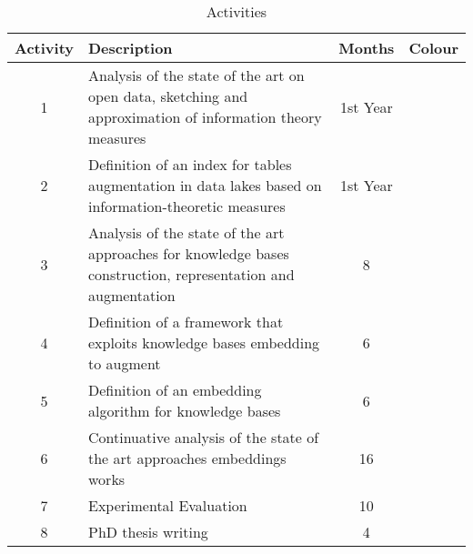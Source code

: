 \begin{table}[h!]\footnotesize
    \centering
    
    \caption{Activities\label{table1}}
    \begin{tabular}{|c|p{9cm}|c|c|}
        \hline
        \textbf{Activity} & \textbf{Description} & \textbf{Months} & \textbf{Colour}\\ \hline
        1 & Analysis of the state of the art on open data, sketching and approximation of information theory measures & 1st Year & \cellcolor{lightgreen} \\\hline
        2 & Definition of an index for tables augmentation in data lakes based on information-theoretic measures& 1st Year & \cellcolor{green} \\\hline
        3 & Analysis of the state of the art approaches for knowledge bases construction, representation and augmentation & 8 & \cellcolor{lightyellow} \\\hline
        4 & Definition of a framework that exploits knowledge bases embedding to augment & 6 & \cellcolor{orange} \\\hline
        5 & Definition of an embedding algorithm for knowledge bases & 6 & \cellcolor{red} \\\hline
        6 & Continuative analysis of the state of the art approaches embeddings works & 16 & \cellcolor{cyan} \\\hline
        7 & Experimental Evaluation & 10 & \cellcolor{blue} \\\hline
        8 & PhD thesis writing & 4 & \cellcolor{blue-violet} \\\hline
    \end{tabular}
\end{table}
    
    \bigbreak
    \vspace{-2em}
    
